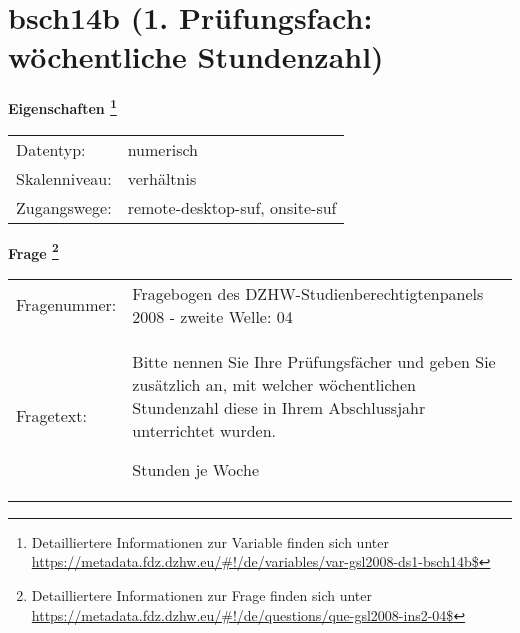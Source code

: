 
    \setcounter{footnote}{0}

    \vspace*{-1.8cm}
	\section{bsch14b (1. Prüfungsfach: wöchentliche Stundenzahl)}
	\label{section:bsch14b}



    \vspace*{0.5cm}
    \noindent\textbf{Eigenschaften
	\footnote{Detailliertere Informationen zur Variable finden sich unter
		\url{https://metadata.fdz.dzhw.eu/\#!/de/variables/var-gsl2008-ds1-bsch14b$}}}\\
	\begin{tabularx}{\hsize}{@{}lX}
	Datentyp: & numerisch \\
	Skalenniveau: & verhältnis \\
	Zugangswege: &
	  remote-desktop-suf, 
	  onsite-suf
 \\
    \end{tabularx}



				\vspace*{0.5cm}
                \noindent\textbf{Frage
	                \footnote{Detailliertere Informationen zur Frage finden sich unter
		              \url{https://metadata.fdz.dzhw.eu/\#!/de/questions/que-gsl2008-ins2-04$}}}\\
				\begin{tabularx}{\hsize}{@{}lX}
					Fragenummer: &
					  Fragebogen des DZHW-Studienberechtigtenpanels 2008 - zweite Welle:
					  04
 \\
					Fragetext: & Bitte nennen Sie Ihre Prüfungsfächer und geben Sie zusätzlich an, mit welcher wöchentlichen Stundenzahl diese in Ihrem Abschlussjahr unterrichtet wurden.\par  Stunden je Woche \\
				\end{tabularx}





